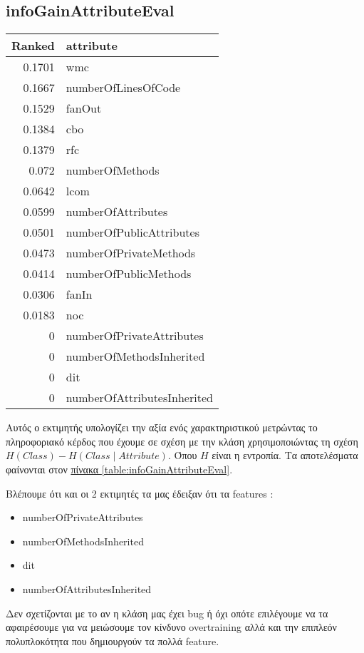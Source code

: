 \subsection{infoGainAttributeΕval}
\begin{center}
\begin{tabular}{r|l}
Ranked & attribute\\
\hline
0.1701 &  wmc\\
0.1667&   numberOfLinesOfCode\\
0.1529&   fanOut\\
0.1384&   cbo\\
0.1379&   rfc\\
0.072 &  numberOfMethods\\
0.0642&   lcom\\
0.0599&   numberOfAttributes\\
0.0501&   numberOfPublicAttributes\\
0.0473&  numberOfPrivateMethods\\
0.0414&   numberOfPublicMethods\\
0.0306&   fanIn\\
0.0183&   noc\\
0      &  numberOfPrivateAttributes\\
0      &  numberOfMethodsInherited\\
0      &  dit\\
0      &  numberOfAttributesInherited\\
\end{tabular}
\label{table:infoGainAttributeΕval}
\end{center}

Αυτός ο εκτιμητής υπολογίζει την αξία ενός χαρακτηριστικού μετρώντας το πληροφοριακό κέρδος που έχουμε σε σχέση με την κλάση χρησιμοποιώντας τη σχέση $H(Class) - H(Class \mid Attribute)$.
Όπου $H$ είναι η εντροπία.
Τα αποτελέσματα φαίνονται στον
\hyperref[table:infoGainAttributeΕval]{πίνακα \ref{table:infoGainAttributeΕval}}.

Βλέπουμε ότι και οι 2 εκτιμητές τα μας έδειξαν ότι τα features :
\begin{itemize}
\bfseries
\item numberOfPrivateAttributes
\item numberOfMethodsInherited
\item dit
\item numberOfAttributesInherited 
\end{itemize}
Δεν σχετίζονται με το αν η κλάση μας έχει bug ή όχι οπότε επιλέγουμε να τα αφαιρέσουμε
για να μειώσουμε τον κίνδυνο overtraining αλλά και την επιπλεόν πολυπλοκότητα που δημιουργούν τα πολλά feature.
